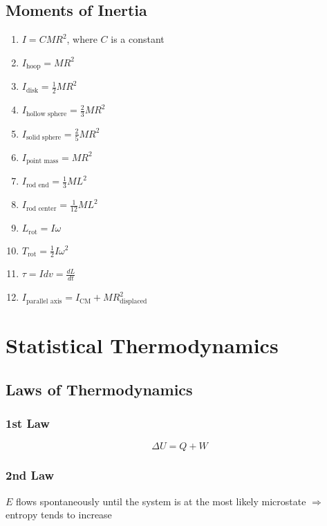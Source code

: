 \documentclass[10pt,a4paper]{article}
\begin{document}
\subsection{Moments of Inertia}
\begin{enumerate}
    \item $I = CMR^2$, where $C$ is a constant
    \item $I_{\textrm{hoop}} = MR^2$ 
    \item $I_{\textrm{disk}} = \frac{1}{2} MR^2$
    \item $I_{\textrm{hollow sphere}} = \frac{2}{3}MR^2$
    \item $I_{\textrm{solid sphere}} = \frac{2}{5}MR^2$
    \item $I_{\textrm{point mass}} = MR^2$
    \item $I_{\textrm{rod end}} = \frac{1}{3}ML^2$
    \item $I_{\textrm{rod center}} = \frac{1}{12} ML^2$
    \item $L_{\textrm{rot}} = I\omega$
    \item $T_{\textrm{rot}} = \frac{1}{2}I\omega^2$
    \item $\tau = I dv = \frac{dL}{dt}$
    \item $I_{\textrm{parallel axis}} = I_{\textrm{CM}} + MR_{\textrm{displaced}}^2$
\end{enumerate}



\section{Statistical Thermodynamics}
\subsection{Laws of Thermodynamics}
\subsubsection{1st Law}
\begin{equation}
 \Delta U = Q + W
\end{equation}

\subsubsection{2nd Law}
$E$ flows spontaneously until the system is at the most likely microstate $\Rightarrow$ entropy tends to increase
\end{document}
